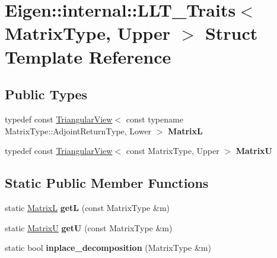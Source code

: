 \hypertarget{struct_eigen_1_1internal_1_1_l_l_t___traits_3_01_matrix_type_00_01_upper_01_4}{}\section{Eigen\+::internal\+::L\+L\+T\+\_\+\+Traits$<$ Matrix\+Type, Upper $>$ Struct Template Reference}
\label{struct_eigen_1_1internal_1_1_l_l_t___traits_3_01_matrix_type_00_01_upper_01_4}
\subsection*{Public Types}
\begin{DoxyCompactItemize}
\item 
\mbox{\label{struct_eigen_1_1internal_1_1_l_l_t___traits_3_01_matrix_type_00_01_upper_01_4_acc67b68b1b03d8e4e2d1a01995de3e64}} 
typedef const \mbox{\hyperlink{class_eigen_1_1_triangular_view}{Triangular\+View}}$<$ const typename Matrix\+Type\+::\+Adjoint\+Return\+Type, Lower $>$ {\bfseries MatrixL}
\item 
\mbox{\label{struct_eigen_1_1internal_1_1_l_l_t___traits_3_01_matrix_type_00_01_upper_01_4_a0ffd546ce7ee0c74c45e092d716c523f}} 
typedef const \mbox{\hyperlink{class_eigen_1_1_triangular_view}{Triangular\+View}}$<$ const Matrix\+Type, Upper $>$ {\bfseries MatrixU}
\end{DoxyCompactItemize}
\subsection*{Static Public Member Functions}
\begin{DoxyCompactItemize}
\item 
\mbox{\label{struct_eigen_1_1internal_1_1_l_l_t___traits_3_01_matrix_type_00_01_upper_01_4_ab9264cfcf0ee971757d0b7c63900ca35}} 
static \mbox{\hyperlink{class_eigen_1_1_triangular_view}{MatrixL}} {\bfseries getL} (const Matrix\+Type \&m)
\item 
\mbox{\label{struct_eigen_1_1internal_1_1_l_l_t___traits_3_01_matrix_type_00_01_upper_01_4_a72cb3f5ce847c9630c44db0734dcb73c}} 
static \mbox{\hyperlink{class_eigen_1_1_triangular_view}{MatrixU}} {\bfseries getU} (const Matrix\+Type \&m)
\item 
\mbox{\label{struct_eigen_1_1internal_1_1_l_l_t___traits_3_01_matrix_type_00_01_upper_01_4_ad02a81d174feca7c46f077de0d6e37eb}} 
static bool {\bfseries inplace\+\_\+decomposition} (Matrix\+Type \&m)
\end{DoxyCompactItemize}



